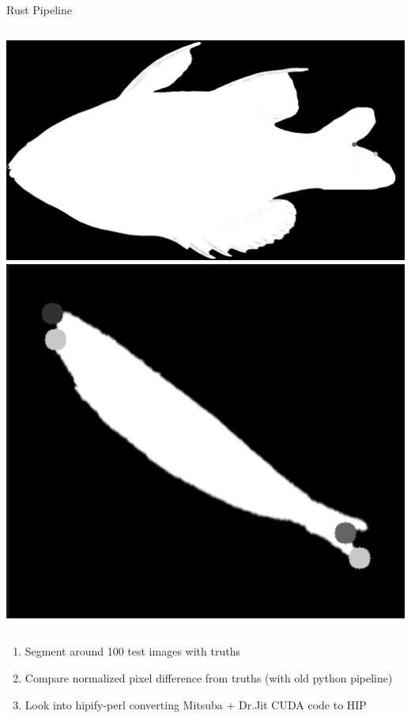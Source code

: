 \begin{frame}{Rust Pipeline}
\begin{columns}[c]
        \centering
        \includegraphics[height=0.45\textheight,keepaspectratio]{./images/img3.png}
        \centering
        \includegraphics[height=0.45\textheight,keepaspectratio]{./images/img2.png}
  \end{columns}
      \begin{enumerate}
        \item Segment around 100 test images with truths
        \item Compare normalized pixel difference from truths (with old python pipeline)
        \item Look into hipify-perl converting Mitsuba + Dr.Jit CUDA code to HIP
    \end{enumerate}
\end{frame}

